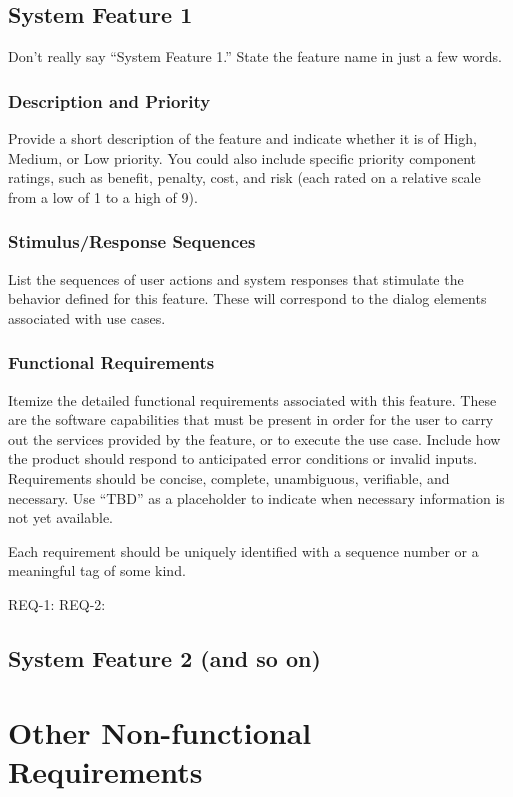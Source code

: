 \documentclass[a4paper,10pt]{article}
\begin{document}
\subsection{System Feature 1}
Don’t really say “System Feature 1.” State the feature name in just a few words.
\subsubsection{Description and Priority}
Provide a short description of the feature and indicate whether it is of High, Medium, or Low priority. You could also include specific priority component ratings, such as benefit, penalty, cost, and risk (each rated on a relative scale from a low of 1 to a high of 9).
\subsubsection{Stimulus/Response Sequences}
List the sequences of user actions and system responses that stimulate the behavior defined for this feature. These will correspond to the dialog elements associated with use cases.
\subsubsection{Functional Requirements}
Itemize the detailed functional requirements associated with this feature. These are the software capabilities that must be present in order for the user to carry out the services provided by the feature, or to execute the use case. Include how the product should respond to anticipated error conditions or invalid inputs. Requirements should be concise, complete, unambiguous, verifiable, and necessary. Use “TBD” as a placeholder to indicate when necessary information is not yet available.

Each requirement should be uniquely identified with a sequence number or a meaningful tag of some kind.

REQ-1:
REQ-2:
\subsection{System Feature 2 (and so on)}

\section{Other Non-functional Requirements}
\end{document}
